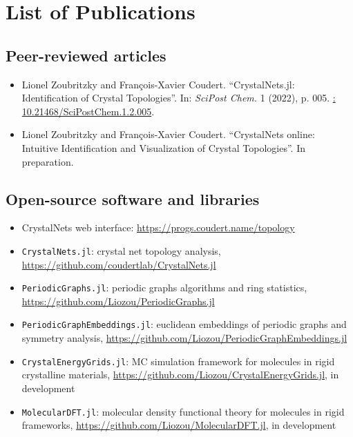 \documentclass[main.tex]{subfiles}
\begin{document}
\chapter*{List of Publications}

\section*{Peer-reviewed articles}
\begin{itemize}
	\item Lionel Zoubritzky and François-Xavier Coudert. ``CrystalNets.jl: Identification of Crystal Topologies''. In: \textsl{SciPost Chem.} 1 (2022), p. 005. \href{https://doi.org/10.21468/SciPostChem.1.2.005}{: 10.21468/SciPostChem.1.2.005}.

	\item Lionel Zoubritzky and François-Xavier Coudert. ``{CrystalNets} online: Intuitive Identification and Visualization of Crystal Topologies''. In preparation.
\end{itemize}

\section*{Open-source software and libraries}
\begin{itemize}
	\item CrystalNets web interface: \url{https://progs.coudert.name/topology}
	\item \texttt{CrystalNets.jl}: crystal net topology analysis, \url{https://github.com/coudertlab/CrystalNets.jl}
	\item \texttt{PeriodicGraphs.jl}: periodic graphs algorithms and ring statistics, \url{https://github.com/Liozou/PeriodicGraphs.jl}
	\item \texttt{PeriodicGraphEmbeddings.jl}: euclidean embeddings of periodic graphs and symmetry analysis, \url{https://github.com/Liozou/PeriodicGraphEmbeddings.jl}
	\item \texttt{CrystalEnergyGrids.jl}: MC simulation framework for molecules in rigid crystalline materials, \url{https://github.com/Liozou/CrystalEnergyGrids.jl}, in development
	\item \texttt{MolecularDFT.jl}: molecular density functional theory for molecules in rigid frameworks, \url{https://github.com/Liozou/MolecularDFT.jl}, in development
\end{itemize}

\end{document}
